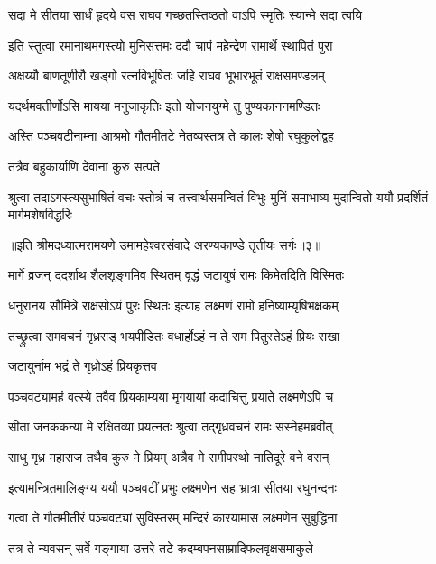 \twolineshloka
{सदा मे सीतया सार्धं हृदये वस राघव}
{गच्छतस्तिष्ठतो वाऽपि स्मृतिः स्यान्मे सदा त्वयि} %

\twolineshloka
{इति स्तुत्वा रमानाथमगस्त्यो मुनिसत्तमः}
{ददौ चापं महेन्द्रेण रामार्थे स्थापितं पुरा} %

\twolineshloka
{अक्षय्यौ बाणतूणीरौ खड्गो रत्नविभूषितः}
{जहि राघव भूभारभूतं राक्षसमण्डलम्} %

\twolineshloka
{यदर्थमवतीर्णोऽसि मायया मनुजाकृतिः}
{इतो योजनयुग्मे तु पुण्यकाननमण्डितः} %

\twolineshloka
{अस्ति पञ्चवटीनाम्ना आश्रमो गौतमीतटे}
{नेतव्यस्तत्र ते कालः शेषो रघुकुलोद्वह} %

\onelineshloka
{तत्रैव बहुकार्याणि देवानां कुरु सत्पते} %


\fourlineindentedshloka
{श्रुत्वा तदाऽगस्त्यसुभाषितं वचः}
{स्तोत्रं च तत्त्वार्थसमन्वितं विभुः}
{मुनिं समाभाष्य मुदान्वितो ययौ}
{प्रदर्शितं मार्गमशेषविद्धरिः} %

{॥इति श्रीमदध्यात्मरामयणे उमामहेश्वरसंवादे
अरण्यकाण्डे तृतीयः सर्गः॥३॥
}





\twolineshloka
{मार्गे व्रजन् ददर्शाथ शैलशृङ्गमिव स्थितम्}
{वृद्धं जटायुषं रामः किमेतदिति विस्मितः} %

\twolineshloka
{धनुरानय सौमित्रे राक्षसोऽयं पुरः स्थितः}
{इत्याह लक्ष्मणं रामो हनिष्याम्यृषिभक्षकम्} %

\twolineshloka
{तच्छ्रुत्वा रामवचनं गृध्रराड् भयपीडितः}
{वधार्होऽहं न ते राम पितुस्तेऽहं प्रियः सखा} %

\onelineshloka
{जटायुर्नाम भद्रं ते गृध्रोऽहं प्रियकृत्तव} %


\twolineshloka
{पञ्चवट्यामहं वत्स्ये तवैव प्रियकाम्यया}
{मृगयायां कदाचित्तु प्रयाते लक्ष्मणेऽपि च} %

\twolineshloka
{सीता जनककन्या मे रक्षितव्या प्रयत्नतः}
{श्रुत्वा तद्गृध्रवचनं रामः सस्नेहमब्रवीत्} %

\twolineshloka
{साधु गृध्र महाराज तथैव कुरु मे प्रियम्}
{अत्रैव मे समीपस्थो नातिदूरे वने वसन्} %

\twolineshloka
{इत्यामन्त्रितमालिङ्ग्य ययौ पञ्चवटीं प्रभुः}
{लक्ष्मणेन सह भ्रात्रा सीतया रघुनन्दनः} %

\twolineshloka
{गत्वा ते गौतमीतीरं पञ्चवट्यां सुविस्तरम्}
{मन्दिरं कारयामास लक्ष्मणेन सुबुद्धिना} %

\twolineshloka
{तत्र ते न्यवसन् सर्वे गङ्गाया उत्तरे तटे}
{कदम्बपनसाम्रादिफलवृक्षसमाकुले} %

